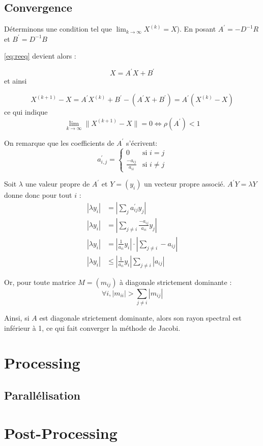 \documentclass[11pt, a4paper]{article}
\begin{document}
\subsection{Convergence}

Déterminons une condition tel que \(\lim_{k \to \infty} X^{(k)} = X\)).
En posant \( A^\prime = -D^{-1}R\) et \( B^\prime = D^{-1}B \)

\eqref{eq:reeq} devient alors :

\[
    X = A^\prime X + B^\prime
\]
et ainsi

\[
    X^{(k+1)} - X = A^\prime X^{(k)} + B^\prime - (A^\prime X + B^\prime)
    =  A^\prime (X^{(k)} - X)
\]
ce qui indique
\[
    \lim_{k \to \infty} \| X^{(k+1)} - X \| = 0 \Leftrightarrow \rho(A^\prime) < 1
\]

On remarque que les coefficients de \( A^\prime \) s'écrivent:
\[
    a^\prime_{i,j} = \left\{
        \begin{array}{lr}
            0 & \text{si } i = j \\
            \frac{-a_{ij}}{a_{ii}} & \text{si } i \neq j
        \end{array}
    \right.
\]

Soit \( \lambda \) une valeur propre de \( A^\prime \) et \( Y = (y_i) \)
un vecteur propre associé.
\( A^\prime Y = \lambda Y \) donne donc pour tout \(i\) :
\begin{align*}
    |\lambda y_i| &= | \sum_j a^\prime_{ij} y_j | \\
    |\lambda y_i| &= | \sum_{j \neq i} \frac{-a_{ij}}{a_{ii}} y_j | \\
    |\lambda y_i| &= |\frac{1}{a_{ii}} y_i| \cdot | \sum_{j \neq i} -a_{ij}| \\
    |\lambda y_i| &\leq |\frac{1}{a_{ii}} y_i| \sum_{j \neq i} |a_{ij}|
\end{align*}

Or, pour toute matrice \( M = (m_{ij}) \) à diagonale strictement dominante :
\[
    \forall i, |m_{ii}| > \sum_{j \neq i} |m_{ij}|
\]

Ainsi, si \( A \) est diagonale strictement dominante, alors son rayon spectral est inférieur à 1, ce qui fait converger la méthode de Jacobi.


\section{Processing}
\subsection{Parallélisation}


\section{Post-Processing}
\end{document}
